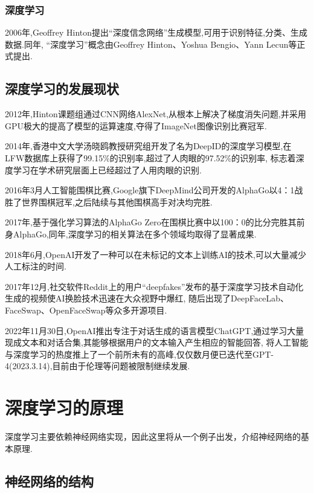 \documentclass[UTF8]{ctexbook}
\begin{document}
\subsection{深度学习}
2006年,Geoffrey Hinton提出“深度信念网络”生成模型,可用于识别特征,分类、生成数据.同年,
“深度学习”概念由Geoffrey Hinton、Yoshua Bengio、Yann Lecun等正式提出.
\section{深度学习的发展现状}
2012年,Hinton课题组通过CNN网络AlexNet,从根本上解决了梯度消失问题,并采用GPU极大的提高了模型的运算速度,夺得了ImageNet图像识别比赛冠军.

2014年,香港中文大学汤晓鸥教授研究组开发了名为DeepID的深度学习模型,在LFW数据库上获得了99.15\%的识别率,超过了人肉眼的97.52\%的识别率,
标志着深度学习在学术研究层面上已经超过了人用肉眼的识别.

2016年3月人工智能围棋比赛,Google旗下DeepMind公司开发的AlphaGo以4：1战胜了世界围棋冠军,之后陆续与其他围棋高手对决均完胜.

2017年,基于强化学习算法的AlphaGo Zero在围棋比赛中以100：0的比分完胜其前身AlphaGo,同年,深度学习的相关算法在多个领域均取得了显著成果.

2018年6月,OpenAI开发了一种可以在未标记的文本上训练AI的技术,可以大量减少人工标注的时间.

2017年12月,社交软件Reddit上的用户“deepfakes”发布的基于深度学习技术自动化生成的视频使AI换脸技术迅速在大众视野中爆红,
随后出现了DeepFaceLab、FaceSwap、OpenFaceSwap等众多开源项目.

2022年11月30日,OpenAI推出专注于对话生成的语言模型ChatGPT,通过学习大量现成文本和对话合集,其能够根据用户的文本输入产生相应的智能回答,
将人工智能与深度学习的热度推上了一个前所未有的高峰,仅仅数月便已迭代至GPT-4(2023.3.14),目前由于伦理等问题被限制继续发展.
\let\cleardoublepage\clearpage
\chapter{深度学习的原理}
深度学习主要依赖神经网络实现，因此这里将从一个例子出发，介绍神经网络的基本原理.
\section{神经网络的结构}
\end{document}
